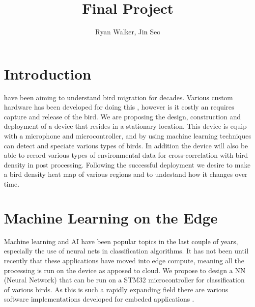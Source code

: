 \documentclass[12pt,journal,compsoc]{IEEEtran}
\begin{document}
\title{Final Project}

\author{Ryan Walker, Jin Seo}

\IEEEtitleabstractindextext{%
}

\maketitle
\IEEEpeerreviewmaketitle

\section{Introduction}
 have been aiming to understand bird migration for decades. Various custom hardware has been developed for doing this \cite{BirdTracking}, however is it costly an requires capture and release of the bird. We are proposing the design, construction and deployment of a device that resides in a stationary location. This device is equip with a microphone and microcontroller, and by using machine learning techniques \cite{ML1} \cite{ML2} can detect and speciate various types of birds. In addition the device will also be able to record various types of environmental data for cross-correlation with bird density in post processing. Following the successful deployment we desire to make a bird density heat map of various regions and to undestand how it changes over time.

\section{Machine Learning on the Edge}
Machine learning and AI have been popular topics in the last couple of years, especially the use of neural nets in classification algorithms. It has not been until recently that these applications have moved into edge compute, meaning all the processing is run on the device as apposed to cloud. We propose to design a NN (Neural Network) that can be run on a STM32 microcontroller for classification of various birds. As this is such a rapidly expanding field there are various software implementations developed for embeded applications \cite{CMSIS} \cite{TF}. 
\end{document}
